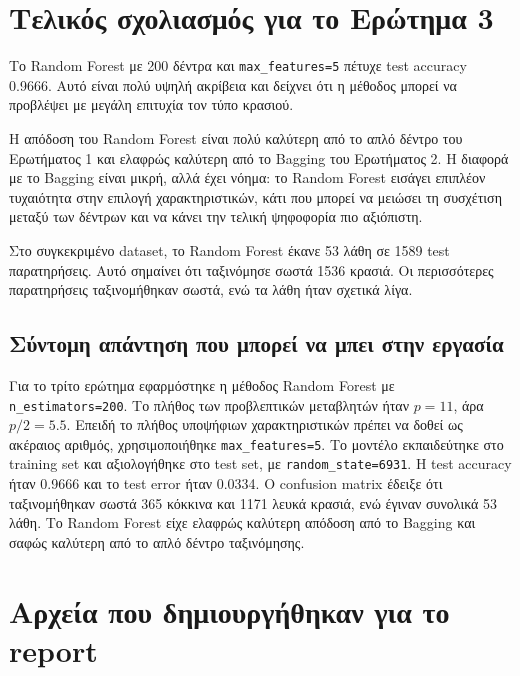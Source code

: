 \documentclass[12pt,a4paper]{article}
\newcommand{\code}[1]{\texttt{\textenglish{#1}}}
\begin{document}
\section{Τελικός σχολιασμός για το Ερώτημα 3}

Το Random Forest με 200 δέντρα και \code{max\_features=5} πέτυχε test accuracy
0.9666. Αυτό είναι πολύ υψηλή ακρίβεια και δείχνει ότι η μέθοδος μπορεί να
προβλέψει με μεγάλη επιτυχία τον τύπο κρασιού.

Η απόδοση του Random Forest είναι πολύ καλύτερη από το απλό δέντρο του
Ερωτήματος 1 και ελαφρώς καλύτερη από το Bagging του Ερωτήματος 2. Η διαφορά
με το Bagging είναι μικρή, αλλά έχει νόημα: το Random Forest εισάγει επιπλέον
τυχαιότητα στην επιλογή χαρακτηριστικών, κάτι που μπορεί να μειώσει τη
συσχέτιση μεταξύ των δέντρων και να κάνει την τελική ψηφοφορία πιο αξιόπιστη.

Στο συγκεκριμένο dataset, το Random Forest έκανε 53 λάθη σε 1589 test
παρατηρήσεις. Αυτό σημαίνει ότι ταξινόμησε σωστά 1536 κρασιά. Οι περισσότερες
παρατηρήσεις ταξινομήθηκαν σωστά, ενώ τα λάθη ήταν σχετικά λίγα.

\subsection{Σύντομη απάντηση που μπορεί να μπει στην εργασία}

Για το τρίτο ερώτημα εφαρμόστηκε η μέθοδος Random Forest με
\code{n\_estimators=200}. Το πλήθος των προβλεπτικών μεταβλητών ήταν
$p=11$, άρα $p/2=5.5$. Επειδή το πλήθος υποψήφιων χαρακτηριστικών πρέπει να
δοθεί ως ακέραιος αριθμός, χρησιμοποιήθηκε \code{max\_features=5}. Το μοντέλο
εκπαιδεύτηκε στο training set και αξιολογήθηκε στο test set, με
\code{random\_state=6931}. Η test accuracy ήταν 0.9666 και το test error ήταν
0.0334. Ο confusion matrix έδειξε ότι ταξινομήθηκαν σωστά 365 κόκκινα και
1171 λευκά κρασιά, ενώ έγιναν συνολικά 53 λάθη. Το Random Forest είχε
ελαφρώς καλύτερη απόδοση από το Bagging και σαφώς καλύτερη από το απλό δέντρο
ταξινόμησης.

\appendix
\section{Αρχεία που δημιουργήθηκαν για το report}
\end{document}
